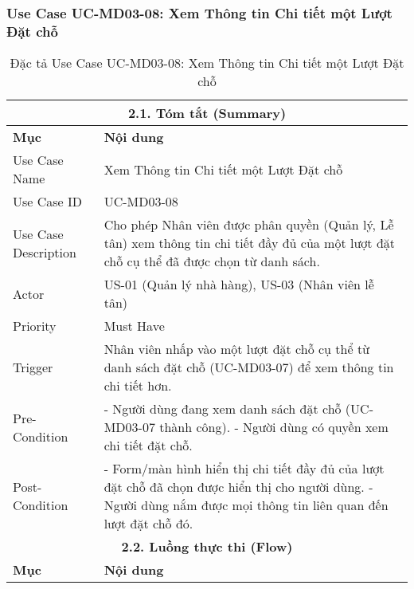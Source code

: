 \subsubsection{Use Case UC-MD03-08: Xem Thông tin Chi tiết một Lượt Đặt chỗ}
\begin{longtable}{|m{4cm}|p{11cm}|}
\caption{Đặc tả Use Case UC-MD03-08: Xem Thông tin Chi tiết một Lượt Đặt chỗ} \label{tab:uc_md03_08_revised_v3} \\
\hline
\multicolumn{2}{|c|}{\textbf{2.1. Tóm tắt (Summary)}} \\
\hline
\textbf{Mục} & \textbf{Nội dung} \\
\hline
\endhead %
\hline
\endfoot %
\hline
\endlastfoot %
Use Case Name & Xem Thông tin Chi tiết một Lượt Đặt chỗ \\
\hline
Use Case ID & UC-MD03-08 \\
\hline
Use Case Description & Cho phép Nhân viên được phân quyền (Quản lý, Lễ tân) xem thông tin chi tiết đầy đủ của một lượt đặt chỗ cụ thể đã được chọn từ danh sách. \\
\hline
Actor & US-01 (Quản lý nhà hàng), US-03 (Nhân viên lễ tân) \\
\hline
Priority & Must Have \\
\hline
Trigger & Nhân viên nhấp vào một lượt đặt chỗ cụ thể từ danh sách đặt chỗ (UC-MD03-07) để xem thông tin chi tiết hơn. \\
\hline
Pre-Condition & - Người dùng đang xem danh sách đặt chỗ (UC-MD03-07 thành công). \newline - Người dùng có quyền xem chi tiết đặt chỗ. \\
\hline
Post-Condition & - Form/màn hình hiển thị chi tiết đầy đủ của lượt đặt chỗ đã chọn được hiển thị cho người dùng. \newline - Người dùng nắm được mọi thông tin liên quan đến lượt đặt chỗ đó. \\
\hline
\multicolumn{2}{|c|}{\textbf{2.2. Luồng thực thi (Flow)}} \\
\hline
\textbf{Mục} & \textbf{Nội dung} \\
\hline

\end{longtable}
